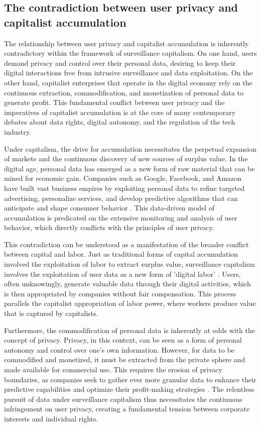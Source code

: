 \begin{refsection}
\subsection{The contradiction between user privacy and capitalist accumulation}

The relationship between user privacy and capitalist accumulation is inherently contradictory within the framework of surveillance capitalism. On one hand, users demand privacy and control over their personal data, desiring to keep their digital interactions free from intrusive surveillance and data exploitation. On the other hand, capitalist enterprises that operate in the digital economy rely on the continuous extraction, commodification, and monetization of personal data to generate profit. This fundamental conflict between user privacy and the imperatives of capitalist accumulation is at the core of many contemporary debates about data rights, digital autonomy, and the regulation of the tech industry.

Under capitalism, the drive for accumulation necessitates the perpetual expansion of markets and the continuous discovery of new sources of surplus value. In the digital age, personal data has emerged as a new form of raw material that can be mined for economic gain. Companies such as Google, Facebook, and Amazon have built vast business empires by exploiting personal data to refine targeted advertising, personalize services, and develop predictive algorithms that can anticipate and shape consumer behavior \cite[pp.~65-68]{zuboff2020age}. This data-driven model of accumulation is predicated on the extensive monitoring and analysis of user behavior, which directly conflicts with the principles of user privacy.

This contradiction can be understood as a manifestation of the broader conflict between capital and labor. Just as traditional forms of capital accumulation involved the exploitation of labor to extract surplus value, surveillance capitalism involves the exploitation of user data as a new form of 'digital labor' \cite[pp.~146-149]{fuchs2014digital}. Users, often unknowingly, generate valuable data through their digital activities, which is then appropriated by companies without fair compensation. This process parallels the capitalist appropriation of labor power, where workers produce value that is captured by capitalists.

Furthermore, the commodification of personal data is inherently at odds with the concept of privacy. Privacy, in this context, can be seen as a form of personal autonomy and control over one’s own information. However, for data to be commodified and monetized, it must be extracted from the private sphere and made available for commercial use. This requires the erosion of privacy boundaries, as companies seek to gather ever more granular data to enhance their predictive capabilities and optimize their profit-making strategies \cite[pp.~34-37]{cohen2019between}. The relentless pursuit of data under surveillance capitalism thus necessitates the continuous infringement on user privacy, creating a fundamental tension between corporate interests and individual rights.


\end{refsection}
